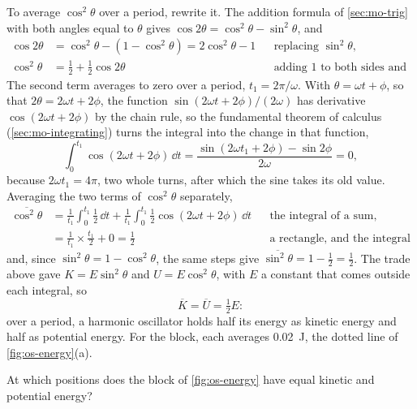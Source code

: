 To average $\cos^2\theta$ over a period, rewrite it. The addition formula
of \cref{sec:mo-trig} with both angles equal to $\theta$ gives
$\cos2\theta = \cos^2\theta - \sin^2\theta$, and
\begin{align*}
   \cos 2\theta &= \cos^2\theta - (1 - \cos^2\theta) = 2\cos^2\theta - 1
      && \text{replacing $\sin^2\theta$,}\\
   \cos^2\theta &= \tfrac12 + \tfrac12\cos 2\theta
      && \text{adding 1 to both sides and halving.}
\end{align*}
The second term averages to zero over a period, $t_1 = 2\pi/\omega$. With
$\theta = \omega t + \phi$, so that $2\theta = 2\omega t + 2\phi$, the
function $\sin(2\omega t + 2\phi)/(2\omega)$ has derivative $\cos(2\omega
t + 2\phi)$ by the chain rule, so the fundamental theorem of calculus
(\cref{sec:mo-integrating}) turns the integral into the change in that
function,
\begin{equation*}
   \int_0^{t_1} \cos(2\omega t + 2\phi)\,\dd t
   = \frac{\sin(2\omega t_1 + 2\phi) - \sin 2\phi}{2\omega} = 0 ,
\end{equation*}
because $2\omega t_1 = 4\pi$, two whole turns, after which the sine takes
its old value. Averaging the two terms of $\cos^2\theta$ separately,
\begin{align*}
   \overline{\cos^2\theta}
   &= \frac{1}{t_1}\int_0^{t_1}\tfrac12\,\dd t
      + \frac{1}{t_1}\int_0^{t_1}\tfrac12\cos(2\omega t + 2\phi)\,\dd t
      && \text{the integral of a sum,}\\
   &= \frac{1}{t_1}\times\frac{t_1}{2} + 0 = \frac12
      && \text{a rectangle, and the integral above,}
\end{align*}
and, since $\sin^2\theta = 1 - \cos^2\theta$, the same steps give
$\overline{\sin^2\theta} = 1 - \frac12 = \frac12$. The trade above gave
$K = E\sin^2\theta$ and $U = E\cos^2\theta$, with $E$ a constant that
comes outside each integral, so
\begin{equation}
   \overline{K} = \overline{U} = \tfrac12 E :
   \label{eq:os-equal-shares}
\end{equation}
over a period, a harmonic oscillator holds half its energy as kinetic
energy and half as potential energy. For the block, each averages
\SI{0.02}{\joule}, the dotted line of \cref{fig:os-energy}(a).


\begin{selfcheck}
At which positions does the block of \cref{fig:os-energy} have equal
kinetic and potential energy?
\end{selfcheck}
